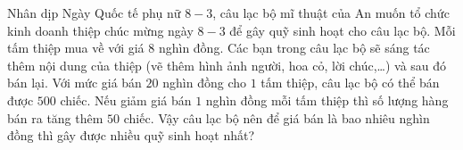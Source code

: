 \begin{ex}
Nhân dịp Ngày Quốc tế phụ nữ $8-3$, câu lạc bộ mĩ thuật của An muốn tổ chức kinh doanh thiệp chúc mừng ngày $8-3$ để gây quỹ sinh hoạt cho câu lạc bộ. Mỗi tấm thiệp mua về với giá $8$ nghìn đồng. Các bạn trong câu lạc bộ sẽ sáng tác thêm nội dung của thiệp (vẽ thêm hình ảnh người, hoa cỏ, lời chúc,\ldots) và sau đó bán lại. Với mức giá bán $20$ nghìn đồng cho $1$ tấm thiệp, câu lạc bộ có thể bán được $500$ chiếc. Nếu giảm giá bán $1$ nghìn đồng mỗi tấm thiệp thì số lượng hàng bán ra tăng thêm $50$ chiếc. Vậy câu lạc bộ nên để giá bán là bao nhiêu nghìn đồng thì gây được nhiều quỹ sinh hoạt nhất?
\end{ex}
